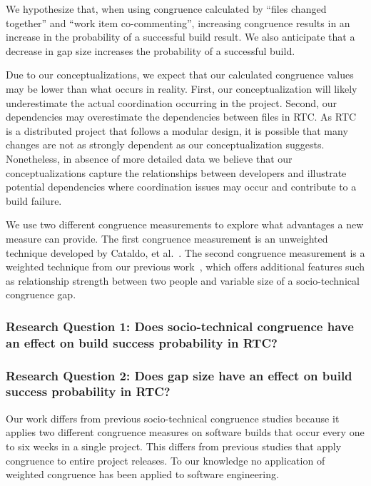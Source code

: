 We hypothesize that, when using congruence calculated by ``files changed together'' and ``work item co-commenting'', increasing congruence results in an increase in the probability of a successful build result. We also anticipate that a decrease in gap size increases the probability of a successful build.

Due to our conceptualizations, we expect that our calculated congruence values may be lower than what occurs in reality. First, our conceptualization will likely underestimate the actual coordination occurring in the project.
Second, our dependencies may overestimate the dependencies between files in RTC.
As RTC is a distributed project that follows a modular design, it is possible that many changes are not as strongly dependent as our conceptualization suggests. Nonetheless, in absence of more detailed data we believe that our conceptualizations capture the relationships between developers and illustrate potential dependencies where coordination issues may occur and contribute to a build failure.

We use two different congruence measurements to explore what advantages a new measure can provide. The first congruence measurement is an unweighted technique developed by Cataldo, et al.~\cite{cataldo:cscw:2006}. The second congruence measurement is a weighted technique from our previous work~\cite{kwan2009:weighted}, which offers additional features such as relationship strength between two people and variable size of a socio-technical congruence gap.

\subsubsection*{Research Question 1: Does socio-technical congruence have an effect on build success probability in RTC?}

\vspace{6pt}

\subsubsection*{Research Question 2: Does gap size have an effect on build success probability in RTC?}

\vspace{6pt}

Our work differs from previous socio-technical congruence studies because it applies two different congruence measures on software builds that occur every one to six weeks in a single project. This differs from previous studies that apply congruence to entire project releases. To our knowledge no application of weighted congruence has been applied to software engineering.

